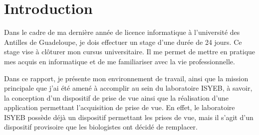 \chapter{Introduction}
    Dans le cadre de ma dernière année de licence informatique à l'université des Antilles de Guadeloupe, je dois effectuer un stage d'une durée de 24 jours. Ce stage vise à clôturer mon cursus universitaire.
    Il me permet de mettre en pratique mes acquis en informatique et de me familiariser avec la vie professionnelle.

    \vspace{0.5cm}
    Dans ce rapport, je présente mon environnement de travail, ainsi que la mission principale que j'ai été amené à accomplir au sein du laboratoire ISYEB, à savoir, la conception d'un dispositif de prise de vue ainsi que la réalisation d'une application permettant l'acquisition de prise de vue.
    En effet, le laboratoire ISYEB possède déjà un dispositif permettant les prises de vue, mais il s'agit d'un dispositif provisoire que les biologistes ont décidé de remplacer.
    

